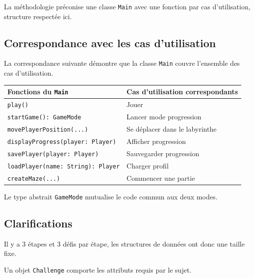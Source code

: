\documentclass{butexFR}
\begin{document}
La méthodologie préconise une classe \texttt{Main} avec une fonction par cas d'utilisation, structure respectée ici.

\subsection{Correspondance avec les cas d'utilisation}

La correspondance suivante démontre que la classe \texttt{Main} couvre l'ensemble des cas d'utilisation.

\vspace{1em}
\begin{center}
\begin{tabular}{|p{5cm}|p{8cm}|}
\hline
\textbf{Fonctions du \texttt{Main}} & \textbf{Cas d'utilisation correspondants} \\
\hline
\texttt{play()} & Jouer \\
\hline
\texttt{startGame(): GameMode} & Lancer mode progression\\
\hline
\texttt{movePlayerPosition(...)} & Se déplacer dans le labyrinthe \\
\hline
\texttt{displayProgress(player: Player)} & Afficher progression \\
\hline
\texttt{savePlayer(player: Player)} & Sauvegarder progression\\
\hline
\texttt{loadPlayer(name: String): Player} & Charger profil \\
\hline
\texttt{createMaze(...)} & Commencer une partie\\
\hline
\end{tabular}
\end{center}
\vspace{1em}

Le type abstrait \texttt{GameMode} mutualise le code commun aux deux modes.

\subsection{Clarifications}



Il y a 3 étapes et 3 défis par étape, les structures de données ont donc une taille fixe.

Un objet \texttt{Challenge} comporte les attributs requis par le sujet.
\end{document}
